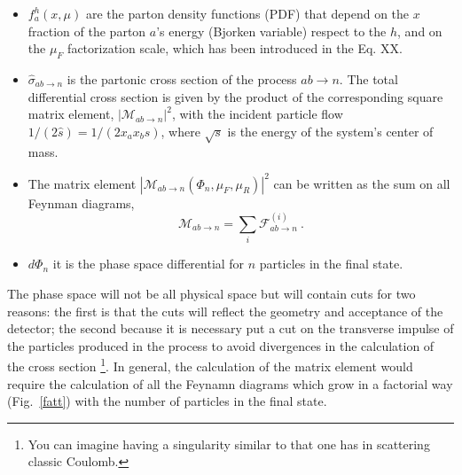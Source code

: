 \begin{itemize}
\item $f_{a}^{h} (x , \mu)$ are the parton density functions (PDF) that depend on the $x$ fraction of the parton $a$'s energy (Bjorken variable) respect to the $h$, and on the $\mu_F $ factorization scale, which has been  introduced  in the Eq. XX.

\item $\hat {\sigma}_ {ab\rightarrow n} $ is the partonic cross section of the process $ ab \rightarrow n $.
The total differential cross section is given by the product of the corresponding square matrix element, $ | \mathcal {M}_{ab \rightarrow n} |^2 $, 
with  the incident particle flow $ 1 / (2 \hat{s}) = 1 / (2 x_a x_b s) $, where $ \sqrt{s} $ is the energy of the system's center of mass.

\item The matrix element $| \mathcal{M}_{ab \rightarrow n}  (\Phi_n , \mu_F , \mu_R) |^2 $  can be written as the sum on all Feynman diagrams,
\begin{equation}
\mathcal{M}_{ab \rightarrow n}= \sum_{i} \mathcal{F}_{ab \rightarrow n}^{(i)} \: \mbox{.} \end{equation}

\item $d\Phi_n$ it is the phase space differential for $ n $ particles in the final state.
\end{itemize}

 The phase space will not be all physical space  but will contain cuts for two reasons: the first is that  the cuts will reflect the geometry and acceptance of the detector; the second because it is necessary put a cut on the transverse impulse of the particles produced in the process to avoid divergences in the calculation of the cross section \footnote {You can imagine having a singularity similar to that one has in scattering  classic Coulomb.}.
In general, the calculation of the matrix element would require the calculation of all the Feynamn diagrams which  grow in a factorial way (Fig.~\ref{fatt}) with the number of particles in the final state.


